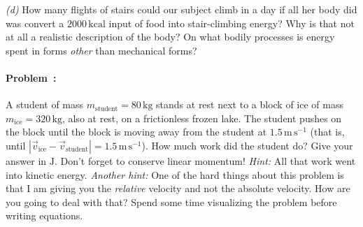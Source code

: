 \documentclass[12pt]{article}
\newcommand{\kg}{\mathrm{kg}}
\newcommand{\m}{\mathrm{m}}
\newcommand{\s}{\mathrm{s}}
\newcommand{\J}{\mathrm{J}}
\newcommand{\mps}{\m\,\s^{-1}}
\newcommand{\kcal}{\mathrm{kcal}}
\begin{document}
\textsl{(d)} How many flights of stairs could our subject climb in a day if
all her body did was convert a $2000\,\kcal$ input of food into
stair-climbing energy?  Why is that not at all a realistic description
of the body?  On what bodily processes is energy spent in forms
\emph{other} than mechanical forms?

\paragraph{Problem~\theproblem:}%
A student of mass $m_\mathrm{student}=80\,\kg$ stands at rest next to
a block of ice of mass $m_\mathrm{ice}=320\,\kg$, also at rest, on a
frictionless frozen lake.  The student pushes on the block until the
block is moving away from the student at $1.5\,\mps$ (that is, until
$\left|\vec{v}_\mathrm{ice}-\vec{v}_\mathrm{student}\right|=1.5\,\mps$).
How much work did the student do?  Give your answer in $\J$.  Don't
forget to conserve linear momentum!  \emph{Hint:} All that work went into
kinetic energy.  \emph{Another hint:} One of the hard things about
this problem is that I am giving you the \emph{relative} velocity and
not the absolute velocity.  How are you going to deal with that?
Spend some time visualizing the problem before writing equations.
\end{document}
